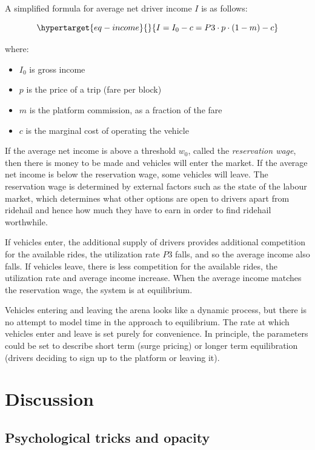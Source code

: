 \documentclass[
  letterpaper,
  DIV=11,
  numbers=noendperiod]{scrartcl}
\begin{document}
A simplified formula for average net driver income \(I\) is as follows:

\begin{equation}\protect\hypertarget{eq-income}{}{
I = I_0 - c
  = P3 \cdot p \cdot (1 - m) - c
}\label{eq-income}\end{equation}

where:

\begin{itemize}
\item
  \(I_0\) is gross income
\item
  \(p\) is the price of a trip (fare per block)
\item
  \(m\) is the platform commission, as a fraction of the fare
\item
  \(c\) is the marginal cost of operating the vehicle
\end{itemize}

If the average net income is above a threshold \(w_0\), called the
\emph{reservation wage}, then there is money to be made and vehicles
will enter the market. If the average net income is below the
reservation wage, some vehicles will leave. The reservation wage is
determined by external factors such as the state of the labour market,
which determines what other options are open to drivers apart from
ridehail and hence how much they have to earn in order to find ridehail
worthwhile.

If vehicles enter, the additional supply of drivers provides additional
competition for the available rides, the utilization rate \(P3\) falls,
and so the average income also falls. If vehicles leave, there is less
competition for the available rides, the utilization rate and average
income increase. When the average income matches the reservation wage,
the system is at equilibrium.

Vehicles entering and leaving the arena looks like a dynamic process,
but there is no attempt to model time in the approach to equilibrium.
The rate at which vehicles enter and leave is set purely for
convenience. In principle, the parameters could be set to describe short
term (surge pricing) or longer term equilibration (drivers deciding to
sign up to the platform or leaving it).

\hypertarget{discussion}{%
\section{Discussion}\label{discussion}}

\hypertarget{psychological-tricks-and-opacity}{%
\subsection{Psychological tricks and
opacity}\label{psychological-tricks-and-opacity}}
\end{document}
